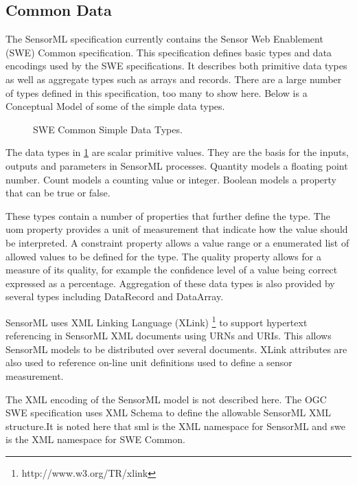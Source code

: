 \documentclass[]{final_report}
\begin{document}
\subsection{Common Data}
The SensorML specification currently contains the Sensor Web Enablement (SWE) Common specification. This specification defines basic types and data encodings used by the SWE specifications. It describes both primitive data types as well as aggregate types such as arrays and records. There are a large number of types defined in this specification, too many to show here. Below is a Conceptual Model of some of the simple data types.

\begin{figure}[h]
\centering
{}
\caption{SWE Common Simple Data Types.}\label{fig:SWESimpleConceptualModel}
\end{figure}

The data types in \ref{fig:SWESimpleConceptualModel} are scalar primitive values. They are the basis for the inputs, outputs and parameters in SensorML processes. Quantity models a floating point number. Count models a counting value or integer. Boolean models a property that can be true or false. 

These types contain a number of properties that further define the type. The uom property provides a unit of measurement that indicate how the value should be interpreted.  A constraint property allows a value range or a enumerated list of allowed values to be defined for the type. The quality property allows for a measure of its quality, for example the confidence level of a value being correct expressed as a percentage. Aggregation of these data types is also provided by several types including DataRecord and DataArray.

SensorML uses XML Linking Language (XLink) \footnote{http://www.w3.org/TR/xlink} to support hypertext referencing in SensorML XML documents using URNs and URIs. This allows SensorML models to be distributed over several documents. XLink attributes are also used to reference on-line unit definitions used to define a sensor measurement.

The XML encoding of the SensorML model is not described here. The OGC SWE specification uses XML Schema to define the allowable SensorML XML structure.It is noted here that sml is the XML namespace for SensorML and swe is the XML namespace for SWE Common.
\end{document}
